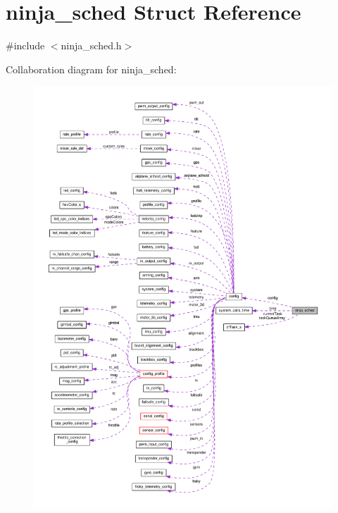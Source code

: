 \hypertarget{structninja__sched}{\section{ninja\+\_\+sched Struct Reference}
\label{structninja__sched}
}


{\ttfamily \#include $<$ninja\+\_\+sched.\+h$>$}



Collaboration diagram for ninja\+\_\+sched\+:\nopagebreak
\begin{figure}[H]
\begin{center}
\leavevmode
\includegraphics[width=350pt]{structninja__sched__coll__graph}
\end{center}
\end{figure}
